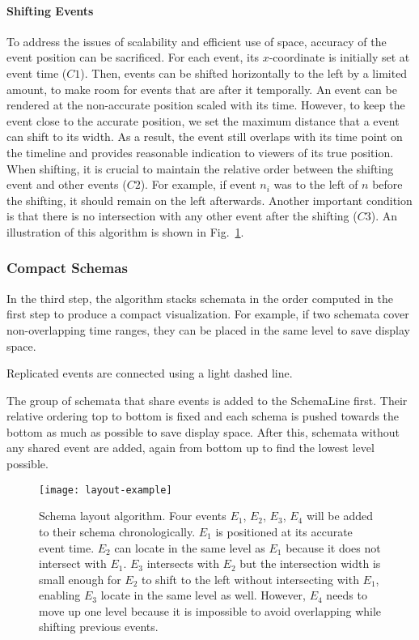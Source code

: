 \paragraph*{Shifting Events}
To address the issues of scalability and efficient use of space, accuracy of the event position can be sacrificed. For each event, its $x$-coordinate is initially set at event time ($C1$). Then, events can be shifted horizontally to the left by a limited amount, to make room for events that are after it temporally. An event can be rendered at the non-accurate position scaled with its time. However, to keep the event close to the accurate position, we set the maximum distance that a event can shift to its width. As a result, the event still overlaps with its time point on the timeline and provides reasonable indication to viewers of its true position. When shifting, it is crucial to maintain the relative order between the shifting event and other events ($C2$). For example, if event $n_i$ was to the left of $n$ before the shifting, it should remain on the left afterwards. Another important condition is that there is no intersection with any other event after the shifting ($C3$). An illustration of this algorithm is shown in Fig.~\ref{fig:layout-schema-example}.

\subsubsection{Compact Schemas}
\label{sub:layout-compact}
In the third step, the algorithm stacks schemata in the order computed in the first step to produce a compact visualization. For example, if two schemata cover non-overlapping time ranges, they can be placed in the same level to save display space. 

Replicated events are connected using a light dashed line.

The group of schemata that share events is added to the SchemaLine first. Their relative ordering top to bottom is fixed and each schema is pushed towards the bottom as much as possible to save display space. After this, schemata without any shared event are added, again from bottom up to find the lowest level possible.

\begin{figure}[ht]
\centering
\texttt{[image: layout-example]}
\caption{Schema layout algorithm. Four events $E_1$, $E_2$, $E_3$, $E_4$ will be added to their schema chronologically. $E_1$ is positioned at its accurate event time. $E_2$ can locate in the same level as $E_1$ because it does not intersect with $E_1$. $E_3$ intersects with $E_2$ but the intersection width is small enough for $E_2$ to shift to the left without intersecting with $E_1$, enabling $E_3$ locate in the same level as well. However, $E_4$ needs to move up one level because it is impossible to avoid overlapping while shifting previous events.}
\label{fig:layout-schema-example}
\end{figure}

